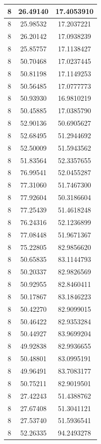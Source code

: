 \documentclass[
]{book}
\begin{document}
\begin{tabular}{c|c|c}
\hline
8 & 26.49140 & 17.4053910\\
\hline
8 & 25.98532 & 17.2037221\\
\hline
8 & 26.20142 & 17.0938239\\
\hline
8 & 25.85757 & 17.1138427\\
\hline
8 & 50.70468 & 17.0237445\\
\hline
8 & 50.81198 & 17.1149253\\
\hline
8 & 50.56485 & 17.0777773\\
\hline
8 & 50.93930 & 16.9810219\\
\hline
8 & 50.45885 & 17.0385790\\
\hline
8 & 52.90136 & 50.6905627\\
\hline
8 & 52.68495 & 51.2944692\\
\hline
8 & 52.50009 & 51.5943562\\
\hline
8 & 51.83564 & 52.3357655\\
\hline
8 & 76.99541 & 52.0455287\\
\hline
8 & 77.31060 & 51.7467300\\
\hline
8 & 77.92604 & 50.3186604\\
\hline
8 & 77.25439 & 51.4618248\\
\hline
8 & 76.24316 & 52.1236899\\
\hline
8 & 77.08448 & 51.9671367\\
\hline
8 & 75.22805 & 82.9856620\\
\hline
8 & 50.65835 & 83.1144793\\
\hline
8 & 50.20337 & 82.9826569\\
\hline
8 & 50.92955 & 82.8460411\\
\hline
8 & 50.17867 & 83.1846223\\
\hline
8 & 50.42270 & 82.9099015\\
\hline
8 & 50.46422 & 82.9353284\\
\hline
8 & 50.44927 & 83.9699204\\
\hline
8 & 49.92838 & 82.9936655\\
\hline
8 & 50.48801 & 83.0995191\\
\hline
8 & 49.96491 & 83.7083177\\
\hline
8 & 50.75211 & 82.9019501\\
\hline
8 & 27.42243 & 51.4388762\\
\hline
8 & 27.67408 & 51.3041121\\
\hline
8 & 27.53740 & 51.5936541\\
\hline
8 & 52.26335 & 94.2493278\\

\end{tabular}
\end{document}
